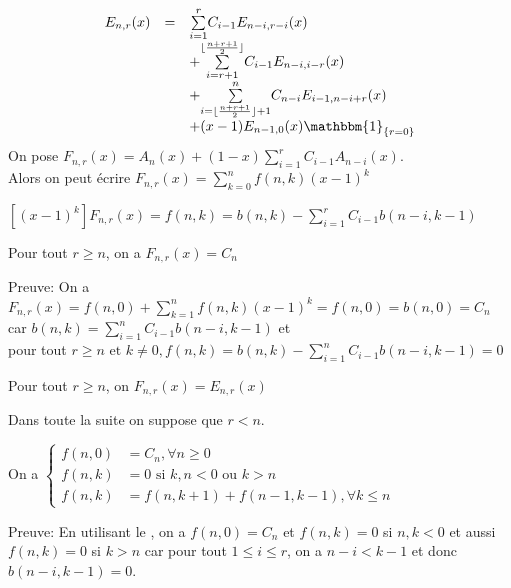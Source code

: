 \begin{equation} \label{eq:Enr}
	\begin{array}{l l l}
		E_{n,r}(x) & =       & \underset{i=1}{\overset{r}{\sum}}C_{i-1}E_{n-i,r-i}(x)                                    \\
		           & \text{} & +\underset{i=r+1}{\overset{\lfloor \frac{n+r+1}{2}\rfloor}{\sum}}C_{i-1}E_{n-i,i-r}(x)    \\
		           & \text{} & +\underset{i=\lfloor \frac{n+r+1}{2}\rfloor +1}{\overset{n}{\sum}}C_{n-i}E_{i-1,n-i+r}(x) \\
		           & \text{} & +(x-1)E_{n-1,0}(x)\mathbbm{1}_{\{r=0\}}
	\end{array}
\end{equation}
On pose $F_{n, r}(x)=A_{n}(x) + (1-x)\sum\limits_{i=1}^{r}C_{i-1}A_{n-i}(x)$. \\Alors on peut écrire $F_{n, r}(x)=\sum\limits_{k=0}^{n}f(n, k)(x-1)^{k}$\\
\begin{lemme}\label{l101}
	$[(x-1)^{k}]F_{n, r}(x)=f(n, k) = b(n, k) - \sum\limits_{i=1}^{r}C_{i-1}b(n-i, k-1)$
\end{lemme}
\begin{proposition}\label{p9}
	Pour tout $r\geq n$, on a $F_{n, r}(x)=C_{n}$
\end{proposition}
Preuve: On a $F_{n, r}(x) = f(n, 0) + \sum\limits_{k=1}^{n}f(n, k)(x-1)^{k} = f(n, 0) =b(n, 0)=C_{n}$ \\car $b(n, k) = \sum\limits_{i=1}^{n}C_{i-1}b(n-i, k-1)$ et\\
pour tout $r\geq n \text{ et } k\neq 0, f(n, k) = b(n, k) - \sum\limits_{i=1}^{n}C_{i-1}b(n-i, k-1)=0$
\begin{corollaire} \label{c100}
	Pour tout $r\geq n$, on $F_{n, r}(x) = E_{n, r}(x)$
\end{corollaire}
Dans toute la suite on suppose que $r<n$.
\begin{proposition}\label{p10}
	On a $\begin{cases}
			f(n, 0) & = C_{n}, \forall n \geq 0                  \\
			f(n, k) & = 0 \text{ si }k, n <0 \text{ ou }k>n      \\
			f(n, k) & = f(n, k+1) + f(n-1, k-1), \forall k\leq n
		\end{cases}$
\end{proposition}
Preuve: En utilisant le , on a $f(n, 0)=C_{n}$ et $f(n, k) = 0$ si $n, k <0$ et aussi $f(n, k)=0$ si $k>n$ car pour tout $1\leq i\leq r$, on a $n-i<k-1$ et donc $b(n-i, k-1)=0$.\\
